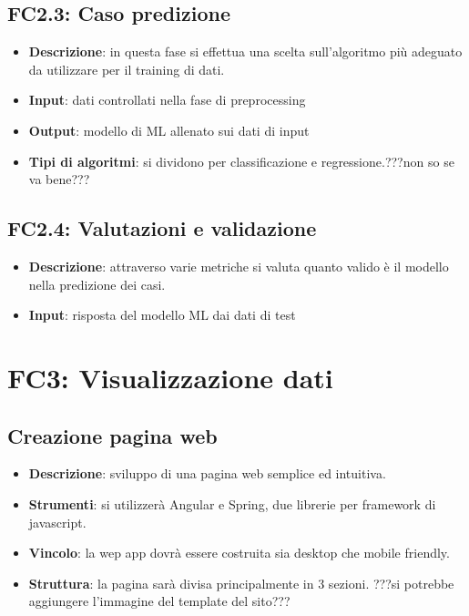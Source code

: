 \subsection{FC2.3: Caso predizione}
\begin{itemize}
	\item \textbf{Descrizione}: in questa fase si effettua una scelta sull'algoritmo più adeguato da utilizzare per il training di dati.
	\item \textbf{Input}: dati controllati nella fase di preprocessing
	\item \textbf{Output}: modello di ML allenato sui dati di input
	\item \textbf{Tipi di algoritmi}: si dividono per classificazione e regressione.???non so se va bene???	
\end{itemize}
\subsection{FC2.4: Valutazioni e validazione}
\begin{itemize}
	\item \textbf{Descrizione}: attraverso varie metriche si valuta quanto valido è il modello nella predizione dei casi.
	\item \textbf{Input}: risposta del modello ML dai dati di test
\end{itemize}
\section{FC3: Visualizzazione dati}
\subsection{Creazione pagina web}
\begin{itemize}
	\item \textbf{Descrizione}: sviluppo di una pagina web semplice ed intuitiva.
	\item \textbf{Strumenti}: si utilizzerà Angular e Spring, due librerie per framework di javascript.
	\item \textbf{Vincolo}: la wep app dovrà essere costruita sia desktop che mobile friendly. 
	\item \textbf{Struttura}: la pagina sarà divisa principalmente in 3 sezioni. ???si potrebbe aggiungere l'immagine del template del sito??? 
\end{itemize}

